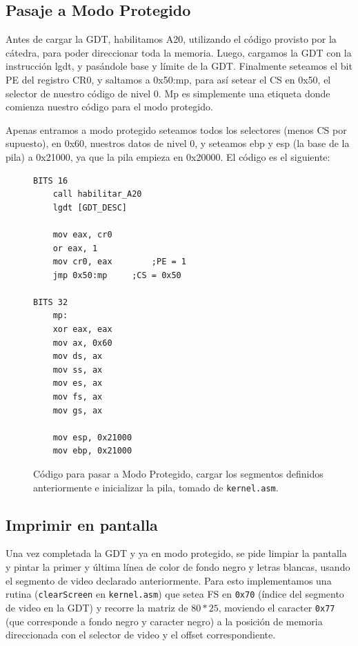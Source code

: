 \documentclass[10pt, a4paper]{article}
\begin{document}
\subsection{Pasaje a Modo Protegido}		
Antes de cargar la GDT, habilitamos A20, utilizando el código provisto por la cátedra, para poder direccionar toda la memoria. Luego, cargamos la GDT con la instrucción lgdt, y pasándole base y límite de la GDT. Finalmente seteamos el bit PE del registro CR0, y saltamos a 0x50:mp, para así setear el CS en 0x50, el selector de nuestro código de nivel 0. Mp es simplemente una etiqueta donde comienza nuestro código para el modo protegido.

Apenas entramos a modo protegido seteamos todos los selectores (menos CS por supuesto), en 0x60, nuestros datos de nivel 0, y seteamos ebp y esp (la base de la pila) a 0x21000, ya que la pila empieza en 0x20000. El código es el siguiente:
\begin{figure}[!h]
\begin{center}
\begin{verbatim}
BITS 16
	call habilitar_A20
	lgdt [GDT_DESC]
	
	mov eax, cr0
	or eax, 1		
	mov cr0, eax		;PE = 1
	jmp 0x50:mp		;CS = 0x50
		
BITS 32
    mp:
	xor eax, eax
	mov ax, 0x60
	mov ds, ax
	mov ss, ax
	mov es, ax
	mov fs, ax
	mov gs, ax
		
	mov esp, 0x21000 
	mov ebp, 0x21000 
\end{verbatim}
\caption{Código para pasar a Modo Protegido, cargar los segmentos definidos anteriormente e inicializar la pila, tomado de \texttt{kernel.asm}.}
\end{center}
\end{figure}
\newpage
\subsection{Imprimir en pantalla}
Una vez completada la GDT y ya en modo protegido, se pide limpiar la pantalla y pintar la primer y última línea de color de fondo negro y letras blancas, usando
el segmento de video declarado anteriormente.
Para esto implementamos una rutina (\texttt{clearScreen} en \texttt{kernel.asm}) que setea FS en \texttt{0x70} (índice del segmento de video en la GDT) y recorre
la matriz de $80*25$, moviendo el caracter \texttt{0x77} (que corresponde a fondo negro y caracter negro) a la posición de memoria direccionada con el selector de video 
y el offset correspondiente.
\end{document}
